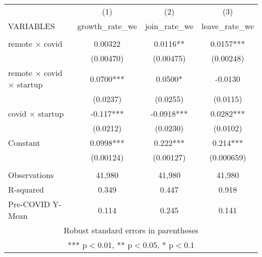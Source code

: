 \begin{tabular}{lccc} \hline
 & (1) & (2) & (3) \\
VARIABLES & growth\_rate\_we & join\_rate\_we & leave\_rate\_we \\ \hline
 &  &  &  \\
remote $\times$ covid & 0.00322 & 0.0116** & 0.0157*** \\
 & (0.00470) & (0.00475) & (0.00248) \\
remote $\times$ covid $\times$ startup & 0.0700*** & 0.0500* & -0.0130 \\
 & (0.0237) & (0.0255) & (0.0115) \\
covid $\times$ startup & -0.117*** & -0.0918*** & 0.0282*** \\
 & (0.0212) & (0.0230) & (0.0102) \\
Constant & 0.0998*** & 0.222*** & 0.214*** \\
 & (0.00124) & (0.00127) & (0.000659) \\
 &  &  &  \\
Observations & 41,980 & 41,980 & 41,980 \\
R-squared & 0.349 & 0.447 & 0.918 \\
 Pre-COVID Y-Mean & 0.114 & 0.245 & 0.141 \\ \hline
\multicolumn{4}{c}{ Robust standard errors in parentheses} \\
\multicolumn{4}{c}{ *** p$<$0.01, ** p$<$0.05, * p$<$0.1} \\
\end{tabular}
